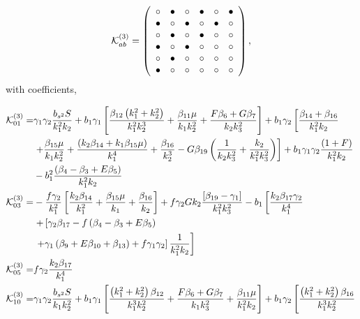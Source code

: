 \begin{equation}
\mathcal{K}^{(3)}_{ab}= 
 \left( \begin {array}{cccccc} \circ &\bullet &\circ &\bullet 
&\circ &\bullet \\  \bullet &\circ &
\bullet &\circ &\bullet &\circ \\  \circ &
\bullet &\circ &\bullet &\circ &\circ \\  
\bullet &\circ &\bullet &\circ &\circ &\circ 
\\  \circ &\bullet &\circ &\circ &\circ &
\circ \\  \bullet &\circ &\circ &\circ &
\circ &\circ \end {array} \right), 
\end{equation}
with coefficients,

\begin{align*}
\ko_{01}^{(3)}=& \gamma_1 \gamma_2 \frac{b_{s^2} S}{k_1^2 k_2} + b_1 \gamma_1 \left[\frac{\beta_{12}\left(k_1^2 + k_2^2\right)}{k_1^2 k_2^3} + \frac{\beta_{11} \mu}{k_1 k_2^2} + \frac{F \beta_{6} + G \beta_{7}}{k_2 k_3^2} \right] + b_1 \gamma_2 \left[ \frac{\beta_{14} + \beta_{16}}{k_1^2 k_2} \right. \\
&\left. + \frac{\beta_{15}\mu}{k_1 k_2^2} + \frac{\left(k_2 \beta_{14} + k_1 \beta_{15} \mu\right)}{k_1^4} + \frac{\beta_{16}}{k_2^3} - G \beta_{19} \left( \frac{1}{k_2 k_3^2} + \frac{k_2}{k_1^2 k_3^2}\right)\right] + b_1 \gamma_1 \gamma_2 \frac{\left(1+F\right)}{k_1^2 k_2} \\
& - b_1^2 \frac{\left({\beta_{4}-\beta_{3}} + E \beta_{5}\right)}{k_1^2 k_2}\\
\ko_{03}^{(3)}=& - \frac{f \gamma_2}{k_1^2} \left[ \frac{k_2 \beta_{14}}{k_1^2} + \frac{\beta_{15}\mu}{k_1} + \frac{\beta_{16}}{k_2} \right] + f \gamma_2 G k_2 \frac{\left[ \beta_{19} - \gamma_1 \right]}{k_1^2 k_3^2} - b_1 \left[ \frac{k_2 \beta_{17} \gamma_2}{k_1^4} \right. \\
&\left. + \left[ \gamma_2 \beta_{17} - f \left( {\beta_{4}-\beta_{3}} + E \beta_{5}\right) \right. \right. \\
&\left. \left. + \gamma_1 \left( \beta_{9} + E \beta_{10} + \beta_{13} \right) + f \gamma_1 \gamma_2 \right] \frac{1}{k_1^2 k_2}\right]\\
\ko_{05}^{(3)}=&  f \gamma_2 \frac{k_2 \beta_{17}}{k_1^4} \\
\ko_{10}^{(3)}=& \gamma_1 \gamma_2 \frac{b_{s^2} S}{k_1 k_2^2} + b_1 \gamma_1 \left[ \frac{\left(k_1^2 + k_2^2\right)\beta_{12}}{k_1^3 k_2^2} + \frac{F \beta_{6} + G \beta_{7}}{k_1 k_3^2} + \frac{\beta_{11}\mu}{k_1^2 k_2}  \right] + b_1 \gamma_2 \left[ \frac{\left(k_1^2 + k_2^2\right) \beta_{16}}{k_1^3 k_2^2} \right. \\

\end{align*}
